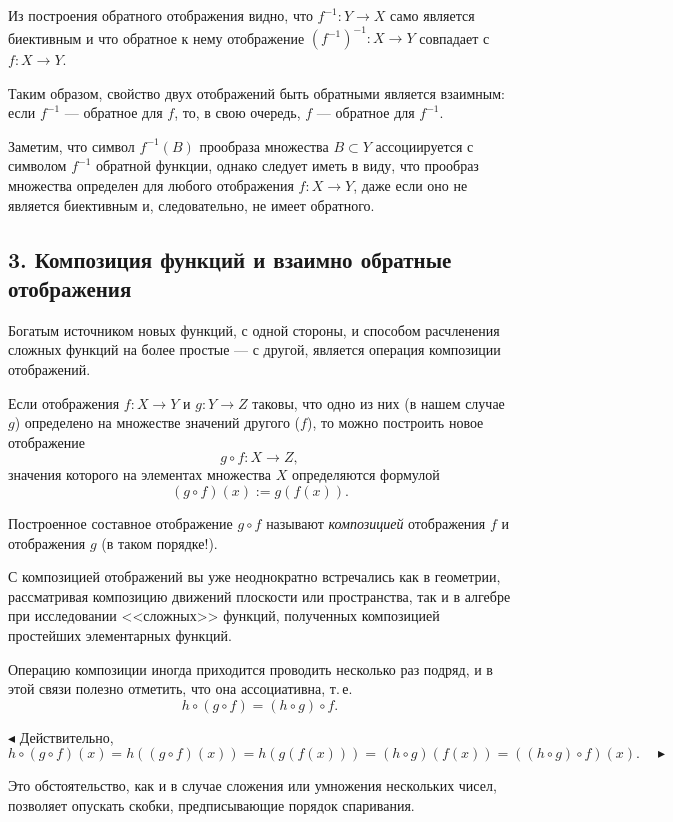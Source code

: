 Из построения обратного отображения видно, что $f^{-1} \colon Y \to X$ само является биективным и что обратное к нему отображение $(f^{-1})^{-1} \colon X \to Y$ совпадает с $f \colon X \to Y$.

Таким образом, свойство двух отображений быть обратными является
взаимным: если $f^{-1}$ --- обратное для $f$, то, в свою очередь, $f$ --- обратное
для $f^{-1}$.

Заметим, что символ $f^{-1}(B)$ прообраза множества $B \subset Y$ ассоциируется с
символом $f^{-1}$ обратной функции, однако следует иметь в виду, что прообраз
множества определен для любого отображения $f \colon X \to Y$, даже если оно не
является биективным и, следовательно, не имеет обратного.

\subsection*{3. Композиция функций и взаимно обратные отображения}

Богатым
источником новых функций, с одной стороны, и способом расчленения сложных функций на более простые --- с другой, является операция композиции
отображений.

Если отображения $f \colon X \to Y$ и $g \colon Y \to Z$ таковы, что одно из них (в нашем
случае $g$) определено на множестве значений другого ($f$), то можно построить новое отображение
\[
  g \circ f \colon X \to Z,
\]
значения которого на элементах множества $X$ определяются формулой
\[
  (g \circ f)(x) := g(f(x)).
\]

Построенное составное отображение $g \circ f$ называют \textit{композицией} отображения $f$ и отображения $g$ (в таком порядке!).


С композицией отображений вы уже неоднократно встречались как в геометрии, рассматривая композицию движений плоскости или пространства,
так и в алгебре при исследовании <<сложных>> функций, полученных композицией простейших элементарных функций.

Операцию композиции иногда приходится проводить несколько раз подряд, и в этой связи полезно отметить, что она ассоциативна, т.\,е.
\[
  h \circ (g \circ f) = (h \circ g) \circ f.
\]

$\blacktriangleleft$ Действительно,
\[
  h \circ (g \circ f)(x) = h((g \circ f)(x)) = h(g(f(x))) = (h \circ g)(f(x)) = ((h \circ g) \circ f)(x). \quad \blacktriangleright
\]

Это обстоятельство, как и в случае сложения или умножения нескольких
чисел, позволяет опускать скобки, предписывающие порядок спаривания.

